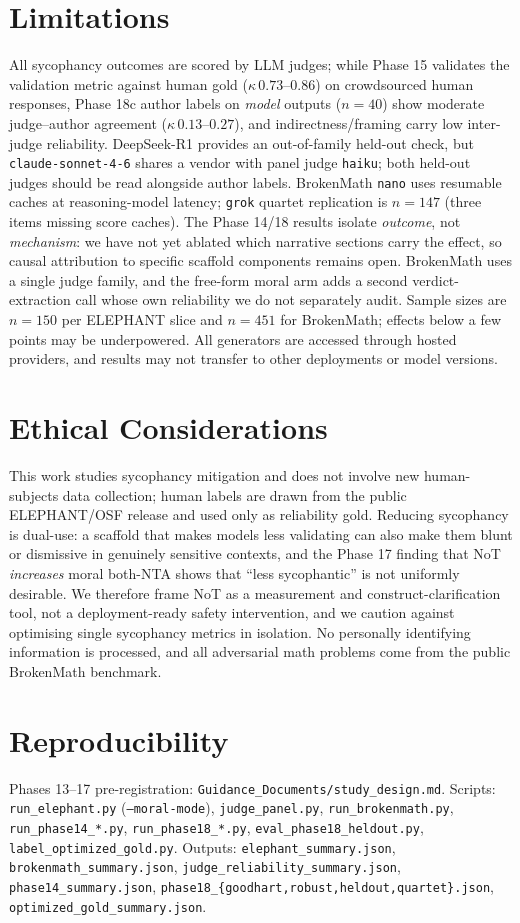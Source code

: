 \documentclass[11pt]{article}
\begin{document}
\section*{Limitations}
All sycophancy outcomes are scored by LLM judges; while Phase 15 validates the validation metric against human gold ($\kappa\,0.73$--$0.86$) on crowdsourced human responses, Phase 18c author labels on \emph{model} outputs ($n{=}40$) show moderate judge--author agreement ($\kappa\,0.13$--$0.27$), and indirectness/framing carry low inter-judge reliability.
DeepSeek-R1 provides an out-of-family held-out check, but \texttt{claude-sonnet-4-6} shares a vendor with panel judge \texttt{haiku}; both held-out judges should be read alongside author labels.
BrokenMath \texttt{nano} uses resumable caches at reasoning-model latency; \texttt{grok} quartet replication is $n{=}147$ (three items missing score caches).
The Phase 14/18 results isolate \emph{outcome}, not \emph{mechanism}: we have not yet ablated which narrative sections carry the effect, so causal attribution to specific scaffold components remains open.
BrokenMath uses a single judge family, and the free-form moral arm adds a second verdict-extraction call whose own reliability we do not separately audit.
Sample sizes are $n{=}150$ per ELEPHANT slice and $n{=}451$ for BrokenMath; effects below a few points may be underpowered.
All generators are accessed through hosted providers, and results may not transfer to other deployments or model versions.

\section*{Ethical Considerations}
This work studies sycophancy mitigation and does not involve new human-subjects data collection; human labels are drawn from the public ELEPHANT/OSF release and used only as reliability gold.
Reducing sycophancy is dual-use: a scaffold that makes models less validating can also make them blunt or dismissive in genuinely sensitive contexts, and the Phase 17 finding that NoT \emph{increases} moral both-NTA shows that ``less sycophantic'' is not uniformly desirable.
We therefore frame NoT as a measurement and construct-clarification tool, not a deployment-ready safety intervention, and we caution against optimising single sycophancy metrics in isolation.
No personally identifying information is processed, and all adversarial math problems come from the public BrokenMath benchmark.

\section*{Reproducibility}
Phases 13--17 pre-registration: \texttt{Guidance\_Documents/study\_design.md}.
Scripts: \texttt{run\_elephant.py} (\texttt{--moral-mode}), \texttt{judge\_panel.py}, \texttt{run\_brokenmath.py}, \texttt{run\_phase14\_*.py}, \texttt{run\_phase18\_*.py}, \texttt{eval\_phase18\_heldout.py}, \texttt{label\_optimized\_gold.py}.
Outputs: \texttt{elephant\_summary.json}, \texttt{brokenmath\_summary.json}, \texttt{judge\_reliability\_summary.json}, \texttt{phase14\_summary.json}, \texttt{phase18\_\{goodhart,robust,heldout,quartet\}.json}, \texttt{optimized\_gold\_summary.json}.


\end{document}
